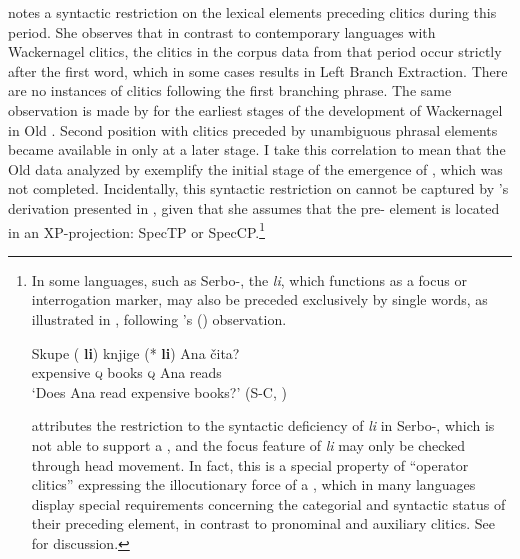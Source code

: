 \documentclass[output=paper,modfonts,newtxmath,hidelinks]{langscibook}
\begin{document}
\citeauthor{pancheva2005} notes a syntactic restriction on the lexical elements preceding  clitics during this period. She observes that in contrast to contemporary  languages with Wackernagel clitics, the clitics in the  corpus data from that period occur strictly after the first word, which in some cases results in Left Branch Extraction. There are no instances of clitics following the first branching phrase. The same observation is made by \citet[Chapter 3]{radanovickocic1988} for the earliest stages of the development of Wackernagel  in Old . Second position  with clitics preceded by unambiguous phrasal elements became available in  only at a later stage. I take this correlation to mean that the Old  data analyzed by \citet{pancheva2005} exemplify the initial stage of the emergence of , which was not completed. Incidentally, this syntactic restriction on  cannot be captured by \citeauthor{pancheva2005}’s derivation presented in , given that she assumes that the pre- element is located in an XP-projection: SpecTP or SpecCP.\footnote{\label{11:fn1}In some  languages, such as Serbo-, the   \textit{li}, which functions as a focus or interrogation marker, may also be preceded exclusively by single words, as illustrated in , following \citeauthor{Boskovic2001}'s (\citeyear[27]{Boskovic2001}) observation.

\ea \label{11:exfni}
\gll Skupe (\hspace{-2pt} \textbf{li}) knjige (*\hspace{-2pt} \textbf{li}) Ana čita?\\
expensive {} \textsc{q} books {} \textsc{q} Ana reads\\
\glt `Does Ana read expensive books?' \hfill(S-C, \citealt[27]{Boskovic2001})
\z

\noindent \citet[31ff.]{Boskovic2001} attributes the restriction to the syntactic deficiency of \textit{li} in Serbo-, which is not able to support a , and the focus feature of \textit{li} may only be checked through head movement. In fact, this is a special property of “operator clitics” expressing the illocutionary force of a , which in many  languages display special requirements concerning the categorial and syntactic status of their preceding element, in contrast to pronominal and auxiliary  clitics. See \citet[Chapter 3]{migdalski2016} for discussion.}
\end{document}
